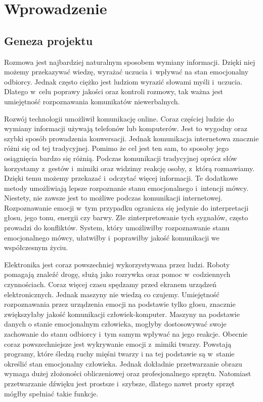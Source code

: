 \documentclass[declaration,shortabstract]{iithesis}
\author         {Elżbieta Plaszczyk}
\begin{document}
\let\cleardoublepage\clearpage
\chapter{Wprowadzenie}
\section{Geneza projektu}
Rozmowa jest najbardziej naturalnym sposobem wymiany informacji. Dzięki niej możemy przekazywać wiedzę, wyrażać uczucia i~wpływać na stan emocjonalny odbiorcy.  Jednak często ciężko jest ludziom wyrazić słowami myśli i~uczucia. Dlatego w~celu poprawy jakości oraz kontroli rozmowy, tak ważna jest umiejętność rozpoznawania komunikatów niewerbalnych. 

Rozwój technologii umożliwił komunikację online. Coraz częściej ludzie do wymiany informacji używają telefonów lub komputerów. Jest to wygodny oraz szybki sposób prowadzenia konwersacji. Jednak komunikacja internetowa znacznie różni się od tej tradycyjnej. Pomimo że cel jest ten sam, to sposoby jego osiągnięcia bardzo się różnią. Podczas komunikacji tradycyjnej oprócz słów korzystamy z~gestów i~mimiki oraz widzimy reakcję osoby, z~którą rozmawiamy. Dzięki temu możemy przekazać i~odczytać więcej informacji. Te dodatkowe metody umożliwiają lepsze rozpoznanie stanu emocjonalnego i~intencji mówcy. Niestety, nie zawsze jest to możliwe podczas komunikacji internetowej. Rozpoznawanie emocji w~tym przypadku ogranicza się jedynie do interpretacji głosu, jego tonu, energii czy barwy. Złe zinterpretowanie tych sygnałów, często prowadzi do konfliktów. System, który umożliwiłby rozpoznawanie stanu emocjonalnego mówcy, ułatwiłby i~poprawiłby jakość komunikacji we współczesnym życiu. 

Elektronika jest coraz powszechniej wykorzystywana przez ludzi. Roboty pomagają znaleźć drogę, służą jako rozrywka oraz pomoc w~codziennych czynnościach. Coraz więcej czasu spędzamy przed ekranem urządzeń elektronicznych. Jednak maszyny nie wiedzą co czujemy. Umiejętność rozpoznawania przez urządzenia emocji na podstawie tylko głosu, znacznie zwiększyłaby jakość komunikacji człowiek-komputer. Maszyny na podstawie danych o stanie emocjonalnym człowieka, mogłyby dostosowywać swoje zachowanie do stanu odbiorcy i~tym samym wpływać na jego reakcje. Obecnie coraz powszechniejsze jest wykrywanie emocji z~mimiki twarzy. Powstają programy, które śledzą ruchy mięśni twarzy i na tej podstawie są w~stanie określić stan emocjonalny człowieka. Jednak dokładnie przetwarzanie obrazu wymaga dużej złożoności obliczeniowej oraz profesjonalnego sprzętu. Natomiast przetwarzanie dźwięku jest prostsze i~szybsze, dlatego nawet prosty sprzęt mógłby spełniać takie funkcje.
\end{document}
